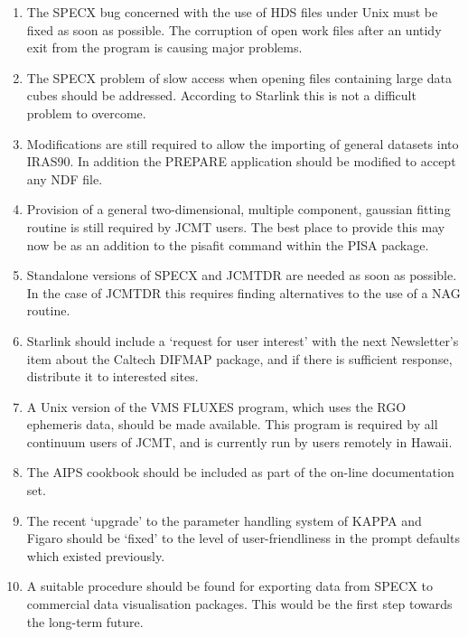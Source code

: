 \begin{enumerate}
\item The SPECX bug concerned with the use of HDS files under Unix must be
fixed as soon as possible. The corruption of open work files after an
untidy exit from the program is causing major problems.

\item The SPECX problem of slow access when opening files containing large
data cubes should be addressed. According to Starlink this is not a
difficult problem to overcome.

\item Modifications are still required to allow the importing of
general datasets into IRAS90. In addition the PREPARE application
should be modified to accept any NDF file.

\item Provision of a general two-dimensional, multiple component,
gaussian fitting routine is still required by JCMT users. The best
place to provide this may now be as an addition to the pisafit command
within the PISA package.

\item Standalone versions of SPECX and JCMTDR are needed as soon
as possible. In the case of JCMTDR this requires finding alternatives
to the use of a NAG routine.

\item Starlink should include a `request for user interest' with the
next Newsletter's item about the Caltech DIFMAP package, and if there
is sufficient response, distribute it to interested sites.

\item A Unix version of the VMS FLUXES program, which uses the RGO
ephemeris data, should be made available. This program is required by
all continuum users of JCMT, and is currently run by users remotely in
Hawaii.

\item The AIPS cookbook should be included as part of the on-line
documentation set.

\item The recent `upgrade' to the parameter handling system of KAPPA and
Figaro should be `fixed' to the level of user-friendliness in the
prompt defaults which existed previously.

\item A suitable procedure should be found for exporting data from
SPECX to commercial data visualisation packages. This would be the
first step towards the long-term future.


\end{enumerate}
